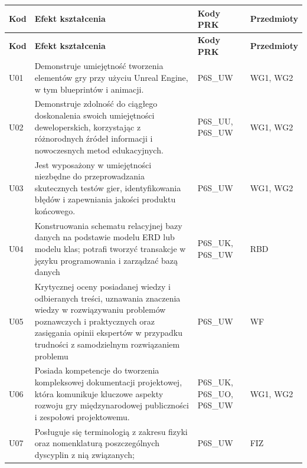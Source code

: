 \documentclass[12pt,a4paper]{article}
\newcommand{\thdrule}{\noalign{\global\setlength{\extrarowheight}{0pt}}}
\newcommand{\thdend}{\noalign{\global\setlength{\extrarowheight}{4pt}}}
\begin{document}
{\scriptsize
\begin{longtable}{m{1cm}m{8.8cm}m{2.1cm}m{2.5cm}}
\thdrule\toprule
\rowcolor{pjatkRed} {\color{white}\footnotesize\textbf{\vphantom{Ag}Kod}} & {\color{white}\footnotesize\textbf{\vphantom{Ag}Efekt kształcenia}} & {\color{white}\footnotesize\textbf{\vphantom{Ag}Kody PRK}} & {\color{white}\footnotesize\textbf{\vphantom{Ag}Przedmioty}} \\
\midrule\thdend
\endfirsthead
\thdrule\toprule
\rowcolor{pjatkRed} {\color{white}\footnotesize\textbf{\vphantom{Ag}Kod}} & {\color{white}\footnotesize\textbf{\vphantom{Ag}Efekt kształcenia}} & {\color{white}\footnotesize\textbf{\vphantom{Ag}Kody PRK}} & {\color{white}\footnotesize\textbf{\vphantom{Ag}Przedmioty}} \\
\midrule\thdend
\endhead
\rowcolor{tableRowLight} U01 & Demonstruje umiejętność tworzenia elementów gry przy użyciu Unreal Engine, w tym blueprintów i animacji. & {\scriptsize P6S\_UW} & {\scriptsize WG1, WG2} \\
\rowcolor{tableRowAlt} U02 & Demonstruje zdolność do ciągłego doskonalenia swoich umiejętności deweloperskich, korzystając z różnorodnych źródeł informacji i nowoczesnych metod edukacyjnych. & {\scriptsize P6S\_UU, P6S\_UW} & {\scriptsize WG1, WG2} \\
\rowcolor{tableRowLight} U03 & Jest wyposażony w umiejętności niezbędne do przeprowadzania skutecznych testów gier, identyfikowania błędów i zapewniania jakości produktu końcowego. & {\scriptsize P6S\_UW} & {\scriptsize WG1, WG2} \\
\rowcolor{tableRowAlt} U04 & Konstruowania schematu relacyjnej bazy danych na podstawie modelu ERD lub modelu klas; potrafi tworzyć transakcje w języku programowania i zarządzać bazą danych & {\scriptsize P6S\_UK, P6S\_UW} & {\scriptsize RBD} \\
\rowcolor{tableRowLight} U05 & Krytycznej oceny posiadanej wiedzy i odbieranych treści, uznawania znaczenia wiedzy w rozwiązywaniu problemów poznawczych i praktycznych oraz zasięgania opinii ekspertów w przypadku trudności z samodzielnym rozwiązaniem problemu & {\scriptsize P6S\_UW} & {\scriptsize WF} \\
\rowcolor{tableRowAlt} U06 & Posiada kompetencje do tworzenia kompleksowej dokumentacji projektowej, która komunikuje kluczowe aspekty rozwoju gry międzynarodowej publiczności i zespołowi projektowemu. & {\scriptsize P6S\_UK, P6S\_UO, P6S\_UW} & {\scriptsize WG1, WG2} \\
\rowcolor{tableRowLight} U07 & Posługuje się terminologią z zakresu fizyki oraz nomenklaturą poszczególnych dyscyplin z nią związanych; & {\scriptsize P6S\_UW} & {\scriptsize FIZ} \\

\end{longtable}}
\end{document}
